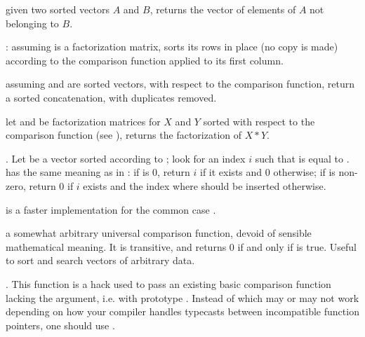  given two sorted
vectors $A$ and $B$, returns the vector of elements of $A$ not belonging to
$B$.

:
assuming  is a factorization matrix, sorts its rows in place (no copy
is made) according to the comparison function  applied to its first
column.

assuming  and  are sorted vectors, with respect to the 
comparison function, return a sorted concatenation, with duplicates removed.

let  and  be factorization matrices for $X$ and $Y$
sorted with respect to the comparison function  (see
), returns the factorization of $X * Y$.

.\hfil\break
Let  be a vector sorted according to ; look for an
index $i$ such that   is equal to .  has the
same meaning as in : if  is 0, return $i$ if it
exists and 0 otherwise; if  is non-zero, return $0$ if $i$ exists
and the index where  should be inserted otherwise.

 is a faster
implementation for the common case .


 a somewhat arbitrary universal
comparison function, devoid of sensible mathematical meaning. It is
transitive, and returns 0 if and only if  is true.
Useful to sort and search vectors of arbitrary data.

. This function is a hack
used to pass an existing basic comparison function lacking the 
argument, i.e. with prototype . Instead of
 which may or may not work depending on how your
compiler handles typecasts between incompatible function pointers, one should
use .


